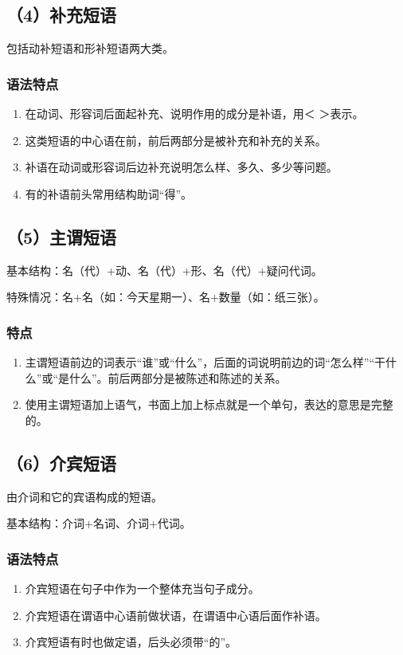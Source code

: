 \subsection{（4）补充短语}
包括动补短语和形补短语两大类。

\subsubsection*{语法特点}
\begin{enumerate}
    \item 在动词、形容词后面起补充、说明作用的成分是补语，用＜ ＞表示。
    \item 这类短语的中心语在前，前后两部分是被补充和补充的关系。
    \item 补语在动词或形容词后边补充说明怎么样、多久、多少等问题。
    \item 有的补语前头常用结构助词“得”。
\end{enumerate}

\subsection{（5）主谓短语}
基本结构：名（代）+动、名（代）+形、名（代）+疑问代词。

特殊情况：名+名（如：今天星期一）、名+数量（如：纸三张）。

\subsubsection*{特点}
\begin{enumerate}
    \item 主谓短语前边的词表示“谁”或“什么”，后面的词说明前边的词“怎么样”“干什么”或“是什么”。前后两部分是被陈述和陈述的关系。
    \item 使用主谓短语加上语气，书面上加上标点就是一个单句，表达的意思是完整的。
\end{enumerate}

\subsection{（6）介宾短语}
由介词和它的宾语构成的短语。

基本结构：介词+名词、介词+代词。

\subsubsection*{语法特点}
\begin{enumerate}
    \item 介宾短语在句子中作为一个整体充当句子成分。
    \item 介宾短语在谓语中心语前做状语，在谓语中心语后面作补语。
    \item 介宾短语有时也做定语，后头必须带“的”。
\end{enumerate}

